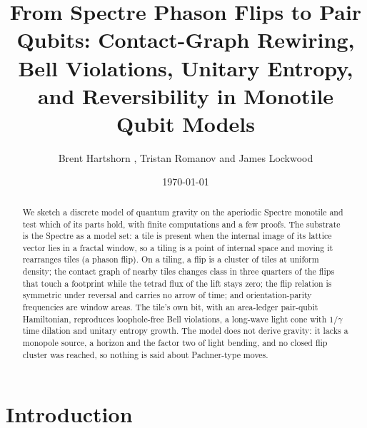 \documentclass[11pt]{article}
\title{From Spectre Phason Flips to Pair Qubits: Contact-Graph Rewiring, Bell Violations, Unitary Entropy, and Reversibility in Monotile Qubit Models}
\author{Brent Hartshorn \orcidlink{0009-0004-2853-655X}, Tristan Romanov and James Lockwood}
\date{\today}
\theoremstyle{definition}
\begin{document}
\maketitle

\begin{abstract}
We sketch a discrete model of quantum gravity on the aperiodic Spectre monotile and test which of its parts hold, with finite computations and a few proofs. The substrate is the Spectre as a model set: a tile is present when the internal image of its lattice vector lies in a fractal window, so a tiling is a point of internal space and moving it rearranges tiles (a phason flip). On a tiling, a flip is a cluster of tiles at uniform density; the contact graph of nearby tiles changes class in three quarters of the flips that touch a footprint while the tetrad flux of the lift stays zero; the flip relation is symmetric under reversal and carries no arrow of time; and orientation-parity frequencies are window areas. The tile's own bit, with an area-ledger pair-qubit Hamiltonian, reproduces loophole-free Bell violations, a long-wave light cone with $1/\gamma$ time dilation and unitary entropy growth. The model does not derive gravity: it lacks a monopole source, a horizon and the factor two of light bending, and no closed flip cluster was reached, so nothing is said about Pachner-type moves.
\end{abstract}

\section{Introduction}\label{sec:intro}
\end{document}
